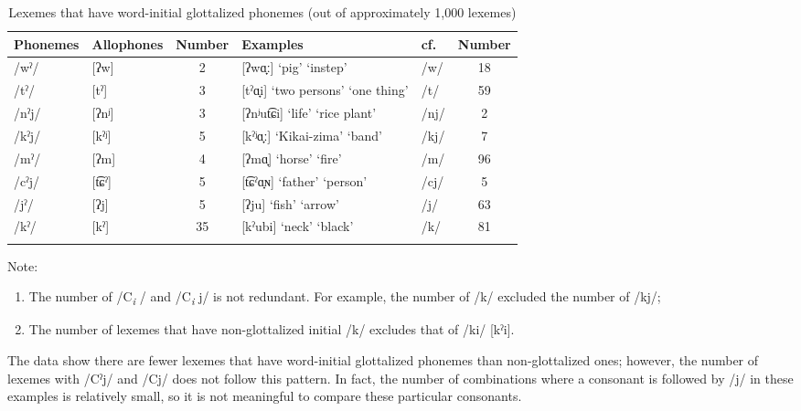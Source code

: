 \begin{table}
\caption{Lexemes that have word-initial glottalized phonemes (out of approximately 1,000 lexemes)}
\begin{tabularx}{\textwidth}{ ll S[table-format=1] Q l S[table-format=2]}
\lsptoprule
{Phonemes} & {Allophones} & {Number} & Examples   &    cf.  & {Number}\\\midrule
{/wˀ/}  & {[ʔw]}     & 2  & [ʔwɑ̟ː]  ‘pig’         \newline{}  ‘instep’ & /w/  & 18\\
{/tˀ/}  & {[tˀ]}     & 3  & [tˀɑ̟i]  ‘two persons’ \newline\relax  [tˀɨɨ]  ‘one thing’  & /t/  & 59\\
{/nˀj/} &  {[ʔnʲ]}   & 3  & [ʔnʲut͡ɕi]  ‘life’    \newline\relax [ʔnʲɨ]  ‘rice plant’ & /nj/ & 2\\
{/kˀj/} &  {[kˀʲ]}   & 5  & [kˀʲɑ̟ː]  ‘Kikai-zima’ \newline\relax  [kˀʲubiː]  ‘band’    & /kj/ & 7\\
{/mˀ/}  & {[ʔm]}     & 4  & [ʔmɑ̟]  ‘horse’        \newline\relax  [ʔmɑ̟t͡sɨ]  ‘fire’    & /m/  & 96\\
{/cˀj/} &  {[t͡ɕˀ]}  & 5  & [t͡ɕˀɑ̟ɴ]  ‘father’    \newline\relax  [t͡ɕˀu]  ‘person’    & /cj/ & 5\\
{/jˀ/}  & {[ʔj]}     & 5  & [ʔju]  ‘fish’         \newline\relax [ʔjɑ̟]  ‘arrow’       & /j/  & 63\\
{/kˀ/}  & {[kˀ]}     & 35 & [kˀubi]  ‘neck’       \newline\relax [kˀuru(ː)]  ‘black’  & /k/  & 81\\
\lspbottomrule
\end{tabularx}
\end{table}

Note:

\begin{enumerate}[label=\alph*.]
\item The number of /C\textit{\textsubscript{i} }/ and /C\textit{\textsubscript{i} }j/ is not redundant. For example, the number of /k/ excluded the number of /kj/;
\item The number of lexemes that have non-glottalized initial /k/ excludes that of /ki/ [kˀi].
\end{enumerate}

The data show there are fewer lexemes that have word-initial glottalized phonemes than non-glottalized ones; however, the number of lexemes with /Cˀj/ and /Cj/ does not follow this pattern. In fact, the number of combinations where a consonant is followed by /j/ in these examples is relatively small, so it is not meaningful to compare these particular consonants.

